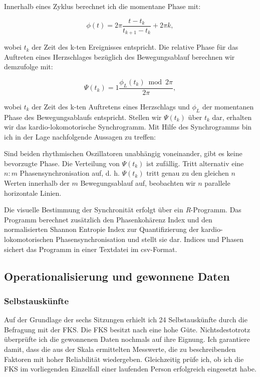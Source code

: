 Innerhalb eines Zyklus berechnet ich die momentane Phase mit:

\begin{equation}
	\phi(t) = 2 \pi \frac{t-t_{k}}{t_{k+1}-t_{k}} + 2 \pi k,
\end{equation}

wobei $t_{k}$ der Zeit des k-ten Ereignisses entspricht. Die relative Phase für das Auftreten eines Herzschlages bezüglich des Bewegungsablauf berechnen wir demzufolge mit:

\begin{equation}
	\Psi(t_{k}) = 1 \frac{\phi_{L}(t_{k}) \bmod 2 \pi}{2 \pi},
\end{equation}

wobei $t_{k}$ der Zeit des k-ten Auftretens eines Herzschlags und $\phi_{L}$ der momentanen Phase des Bewegungsablaufs entspricht. Stellen wir $\Psi(t_{k})$ über $t_{k}$ dar, erhalten wir das kardio-lokomotorische Synchrogramm. Mit Hilfe des Synchrogramms bin ich in der Lage nachfolgende Aussagen zu treffen:

Sind beiden rhythmischen Oszillatoren unabhängig voneinander, gibt es keine bevorzugte Phase. Die Verteilung von $\Psi(t_{k})$ ist zufällig. Tritt alternativ eine $n:m$ Phasensynchronisation auf, d. h. $\Psi(t_{k})$ tritt genau zu den gleichen $n$ Werten innerhalb der $m$ Bewegungsablauf auf, beobachten wir $n$ parallele horizontale Linien.

Die visuelle Bestimmung der Synchronität erfolgt über ein \emph{R}-Programm. Das Programm berechnet zusätzlich den Phasenkohärenz Index \citep{Rosenblum2003} und den normalisierten Shannon Entropie Index \citep{Tass1998, Niizeki2005} zur Quantifizierung der kardio-lokomotorischen Phasensynchronisation und stellt sie dar. Indices und Phasen sichert das Programm in einer Textdatei im \acs{csv}-Format.

\subsection{Operationalisierung und gewonnene Daten}
\subsubsection{Selbstauskünfte}
Auf der Grundlage der sechs Sitzungen erhielt ich 24 Selbstauskünfte durch die Befragung mit der \ac{FKS}. Die \ac{FKS} besitzt nach \citet{Rheinberg2003} eine hohe Güte. Nichtsdestotrotz überprüfte ich die gewonnenen Daten nochmals auf ihre Eignung. Ich garantiere damit, dass die aus der Skala ermittelten Messwerte, die zu beschreibenden Faktoren mit hoher Reliabilität wiedergeben. Gleichzeitig prüfe ich, ob ich die \ac{FKS} im vorliegenden Einzelfall einer laufenden Person erfolgreich eingesetzt habe.


